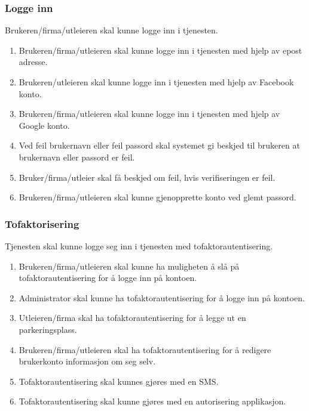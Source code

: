 \subsubsection{Logge inn}
\label{logge_inn}
Brukeren/firma/utleieren skal kunne logge inn i tjenesten.
\begin{enumerate}[label=(\alph*)]
    \item Brukeren/firma/utleieren skal kunne logge inn i tjenesten med hjelp av epost adresse.
    \item Brukeren/utleieren skal kunne logge inn i tjenesten med hjelp av Facebook konto.
    \item Brukeren/firma/utleieren skal kunne logge inn i tjenesten med hjelp av Google konto.
    \item Ved feil brukernavn eller feil passord skal systemet gi beskjed til brukeren at brukernavn eller passord er feil.
    \item Bruker/firma/utleier skal få beskjed om feil, hvis verifiseringen er feil.
    \item Brukeren/firma/utleieren skal kunne gjenopprette konto ved glemt passord.
\end{enumerate}

\subsubsection{Tofaktorisering}
\label{tofaktor}
Tjenesten skal kunne logge seg inn i tjenesten med tofaktorautentisering.
\begin{enumerate}[label=(\alph*)]
    \item Brukeren/firma/utleieren skal kunne ha muligheten å slå på       tofaktorautentisering for å logge inn på kontoen.
    \item Administrator skal kunne ha tofaktorautentisering for å logge inn på kontoen.
    \item Utleieren/firma skal ha tofaktorautentisering for å legge ut en parkeringsplass.
    \item Brukeren/firma/utleieren skal ha tofaktorautentisering for å redigere brukerkonto informasjon om seg selv.
    \item Tofaktorautentisering skal kunnes gjøres med en SMS.
    \item Tofaktorautentisering skal kunne gjøres med en  autorisering applikasjon.
\end{enumerate}

